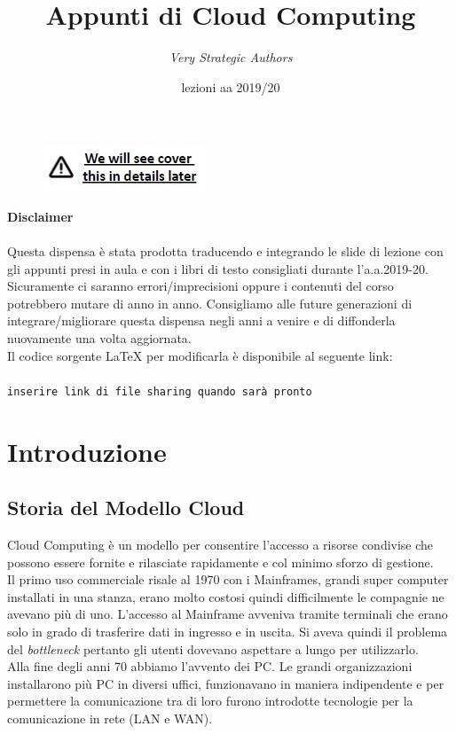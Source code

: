 \documentclass{article}
\title{Appunti di Cloud Computing}
\author{\textit{Very Strategic Authors}}
\date{lezioni aa 2019/20}
\begin{document}
\maketitle

\begin{figure}[H]
    \centering
    \includegraphics[scale=1]{img/cover.jpg}
\end{figure}

\tableofcontents
\newpage

{\Huge \textbf{Disclaimer}}\\ \\
Questa dispensa è stata prodotta traducendo e integrando le slide di lezione con gli appunti presi in aula e con i libri di testo consigliati durante l'a.a.2019-20. Sicuramente ci saranno errori/imprecisioni oppure i contenuti del corso potrebbero mutare di anno in anno. Consigliamo alle future generazioni di integrare/migliorare questa dispensa negli anni a venire e di diffonderla nuovamente una volta aggiornata.\\
Il codice sorgente LaTeX per modificarla è disponibile al seguente link:\\ \\
\texttt{inserire link di file sharing quando sarà pronto}

\newpage
\section{Introduzione}
\subsection{Storia del Modello Cloud}
Cloud Computing è un modello per consentire l’accesso a risorse condivise che possono essere fornite e rilasciate rapidamente e col minimo sforzo di gestione.\\
Il primo uso commerciale risale al 1970 con i Mainframes, grandi super computer installati in una stanza, erano molto costosi quindi difficilmente le compagnie ne avevano più di uno. L’accesso al Mainframe avveniva tramite terminali che erano solo in grado di trasferire dati in ingresso e in uscita. Si aveva quindi il problema del \textit{bottleneck} pertanto gli utenti dovevano aspettare a lungo per utilizzarlo.\\
Alla fine degli anni 70 abbiamo l'avvento dei PC. Le grandi organizzazioni installarono più PC in diversi uffici, funzionavano in maniera indipendente e per permettere la comunicazione tra di loro furono introdotte tecnologie per la comunicazione in rete (LAN e WAN).
\end{document}
